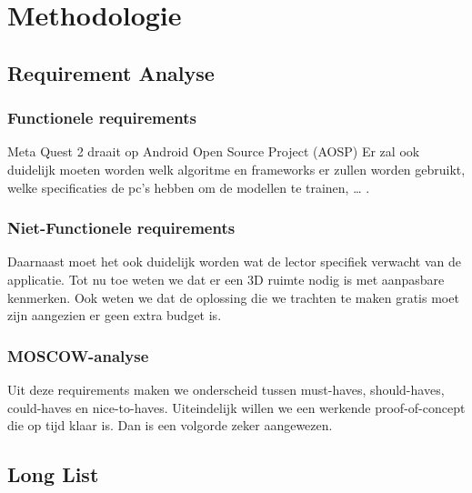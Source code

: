 \documentclass{hogent-article}
\begin{document}
\section{Methodologie}%
\label{sec:methodologie}


\subsection{Requirement Analyse}



\subsubsection{Functionele requirements}

Meta Quest 2 draait op Android Open Source Project (AOSP)
Er zal ook duidelijk moeten worden welk algoritme en frameworks er zullen worden gebruikt, welke specificaties de pc’s hebben om de modellen te trainen, … .

\subsubsection{Niet-Functionele requirements}

Daarnaast moet het ook duidelijk worden wat de lector specifiek verwacht van de applicatie. Tot nu toe weten we dat er een 3D ruimte nodig is met aanpasbare kenmerken. Ook weten we dat de oplossing die we trachten te maken gratis moet zijn aangezien er geen extra budget is. 

\subsubsection{MOSCOW-analyse}

Uit deze requirements maken we onderscheid tussen must-haves, should-haves, could-haves en nice-to-haves. Uiteindelijk willen we een werkende proof-of-concept die op tijd klaar is. Dan is een volgorde zeker aangewezen.

\subsection{Long List}
\end{document}
